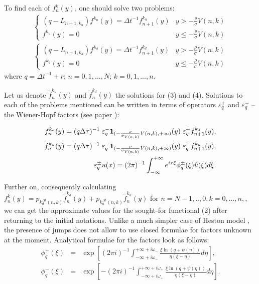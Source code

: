 \documentclass[a4paper]{jpconf}
\begin{document}
To find each of $f_{n}^{k}(y)$, one should solve two problems:
\begin{gather}
	\begin{cases}
	(q - L_{n+1,k_{u}})f^{k_{u}}(y) = {\Delta t}^{-1} f^{k_u}_{n+1}(y) & y > - \frac{\rho}{\sigma}V(n,k) \\
	f^{k_{u}}(y) = 0 & y \le - \frac{\rho}{\sigma}V(n,k)
	\end{cases}
	\end{gather}
\begin{gather}
	\begin{cases}
	(q - L_{n+1,k_{d}})f^{k_{d}}(y) = {\Delta t}^{-1} f^{k_d}_{n+1}(y) & y > - \frac{\rho}{\sigma}V(n,k) \\
	f^{k_{d}}(y) = 0 & y \le - \frac{\rho}{\sigma}V(n,k)
	\end{cases}
	\end{gather}
where $q = {\Delta t}^{-1} + r$; $n = 0,1,...,N$; $k = 0,1,...,n$.

Let us denote $\widetilde{f}_n^{k_u}(y)$ and $\widetilde{f}_n^{k_d}(y)$ the solutions for (3) and (4). Solutions to each of the problems mentioned can be written in terms of operators $\varepsilon^{+}_{q}$ and $\varepsilon^{-}_{q}$ -- the Wiener-Hopf factors (see paper \cite{kudr_and_lev}):

\begin{eqnarray*}
	f_{n}^{k_{d}}(y) = (q{\Delta \tau})^{-1} \; \varepsilon^{-}_{q} {\bf 1}_{(- \frac{\rho}{\sigma_{V(n,k)}}V(n,k), +\infty)}(y) \; \varepsilon^{+}_{q} f_{n+1}^{k_d}(y),\\
	f_{n}^{k_{u}}(y) = (q{\Delta \tau})^{-1} \; \varepsilon^{-}_{q} {\bf 1}_{(- \frac{\rho}{\sigma_{V(n,k)}}V(n,k), +\infty)}(y) \; \varepsilon^{+}_{q} f_{n+1}^{k_u}(y),\\
	\varepsilon^\pm_q u(x) = (2\pi)^{-1} \int_{-\infty}^{+\infty} e^{ix\xi} \phi^\pm_q (\xi) \hat{u}(\xi) d\xi.
\end{eqnarray*}

Further on, consequently calculating $f_{n}^{k}(y) = p_{k^{{\Delta t}}_{d}(n,k)}\widetilde{f}^{k_d}_{n}(y) + p_{k^{{\Delta t}}_{u}(n,k)}\widetilde{f}^{k_u}_{n}(y)$ for $n=N-1,..,0, k = 0,...,n,$, we can get the approximate values for the sought-for functional (2) after returning to the initial notations. Unlike a much simpler case of Heston model \cite{kudr_rod}, the presence of jumps does not allow to use closed formulae for factors unknown at the moment. Analytical formulae for the factors look as follows:
\begin{eqnarray*}
	\phi^+_q(\xi)&=&\exp\left[(2\pi i)^{-1}
	\int_{-\infty+i\omega_-}^{+\infty+i\omega_-}\frac{\xi\ln(q+\psi(\eta))}
	{\eta(\xi-\eta)}d\eta\right],\\
	\phi^-_q(\xi)&=&\exp\left[-(2\pi i)^{-1}
	\int_{-\infty+i\omega_+}^{+\infty+i\omega_+}\frac{\xi\ln(q+\psi(\eta))}
	{\eta(\xi-\eta)}d\eta\right].
\end{eqnarray*}
\end{document}
